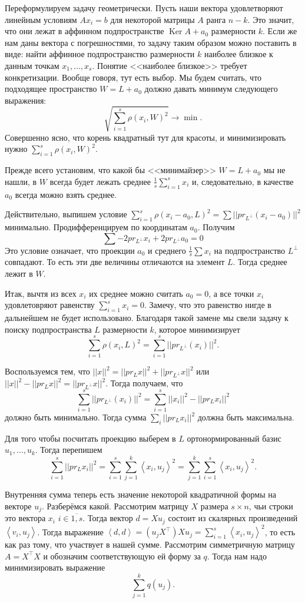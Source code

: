 \documentclass[10pt,a4paper,oneside]{book}
\theoremstyle{definition}
\newcommand{\ovl}{\overline}
\DeclareMathOperator{\Ker}{Ker}
\def\lan{\left\langle }
\def\ran{\right\rangle}
\begin{document}
Переформулируем задачу геометрически. Пусть наши вектора удовлетворяют линейным условиям $Ax_i=b$ для некоторой матрицы $A$ ранга $n-k$. Это значит, что они лежат в аффинном подпространстве $\Ker A + a_0$ размерности $k$. Если же нам даны вектора с погрешностями, то задачу таким образом можно поставить в виде: найти аффинное подпространство размерности $k$ наиболее близкое к данным точкам $x_1,\dots,x_s$. Понятие <<наиболее близкое>> требует конкретизации. Вообще говоря, тут есть выбор. Мы будем считать, что подходящее пространство $W=L+a_0$ должно давать минимум следующего выражения:
$$\sqrt{\sum_{i=1}^s \rho(x_i,W)^2} \to \min.$$
Совершенно ясно, что корень квадратный тут для красоты, и минимизировать нужно $\sum_{i=1}^s \rho(x_i,W)^2$.

Прежде всего установим, что какой бы <<минимайзер>> $W=L+a_0$ мы не нашли, в $W$ всегда будет лежать среднее $\frac{1}{s}\sum_{i=1}^s x_i$ и, следовательно, в качестве $a_0$ всегда можно взять среднее.

Действительно, выпишем условие $\sum_{i=1}^s \rho(x_i-a_0, L)^2=\sum ||pr_{L^{\bot}} (x_i-a_0)||^2$  минимально.  Продифференцируем по координатам $a_0$. Получим $$\sum -2pr_{L^{\bot}} x_i + 2 pr_{L^{\bot}} a_0=0$$
 Это условие означает, что проекции $a_0$ и среднего $\frac{1}{s}\sum x_i$ на подпространство $L^{\bot}$ совпадают. То есть эти две величины отличаются на элемент $L$. Тогда среднее лежит в $W$. 

Итак, вычтя из всех $x_i$ их среднее можно считать $a_0=0$, а все точки $x_i$ удовлетовряют равенству $\sum_{i=1}^s x_i=0$. Замечу, что это равенство нигде в дальнейшем не будет использовано. Благодаря такой замене мы свели задачу к поиску подпространства $L$ размерности $k$, которое минимизирует 
$$\sum_{i=1}^s \rho(x_i, L)^2=\sum_{i=1}^s ||pr_{L^{\bot}} (x_i)||^2.$$

Воспользуемся тем, что $||x||^2=||pr_L x||^2+||pr_{L^{\bot}} x||^2$ или $||x||^2-||pr_L x||^2=||pr_{L^{\bot}} x||^2$. Тогда получаем, что
$$\sum_{i=1}^s ||pr_{L^{\bot}}(x_i)||^2=\sum_{i=1}^s ||x_i||^2-||pr_L x_i||^2$$
должно быть минимально. Тогда сумма $\sum_i ||pr_L x_i||^2$ должна быть максимальна.


Для того чтобы посчитать проекцию выберем в $L$ ортонормированный базис $u_1,\dots,u_k$. Тогда перепишем
$$\sum_{i=1}^s ||pr_L x_i||^2=\sum_{i=1}^s\sum_{j=1}^k \lan x_i,u_j\ran^2=\sum_{j=1}^k \sum_{i=1}^s \lan x_i,u_j\ran^2.$$

Внутренняя сумма теперь есть значение некоторой квадратичной формы на векторе $u_j$. Разберёмся какой. Рассмотрим матрицу $X$ размера $s\times n$, чьи строки это  вектора $x_i$ $i\in\ovl{1,s}$. Тогда вектор $d=Xu_j$ состоит из скалярных произведений  $\lan v_i, u_j\ran$. Тогда выражение $\lan d,d\ran = (u_jX^{\top})Xu_j = \sum_{i=1}^s \lan x_i,u_j\ran^2$, то есть как раз тому, что участвует в нашей сумме. Рассмотрим симметричную матрицу $A=X^{\top}X$ и обозначим соответствующую ей форму за $q$. Тогда нам надо минимизировать выражение
$$\sum_{j=1}^k q(u_j).$$
\end{document}
